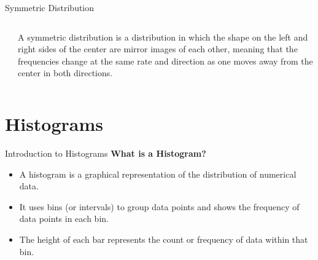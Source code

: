 \documentclass[handout]{beamer} %
\begin{document}
\begin{frame}{Symmetric Distribution}


\begin{columns}[T,onlytextwidth]
    \begin{column}{0.75\textwidth}
    \end{column}

    \hspace{-2em}
    \begin{column}{0.3\textwidth}
    \footnotesize
     A symmetric distribution is a distribution in which the shape on the left and right sides of the center are mirror images of each other, meaning that the frequencies change at the same rate and direction as one moves away from the center in both directions.
    \end{column}
\end{columns}

\end{frame}



\section{Histograms}

\begin{frame}{Introduction to Histograms}
    \textbf{What is a Histogram?}
    \begin{itemize}
        \item A histogram is a graphical representation of the distribution of numerical data.
        \item It uses bins (or intervals) to group data points and shows the frequency of data points in each bin.
        \item The height of each bar represents the count or frequency of data within that bin.
    \end{itemize}
\end{frame}
\end{document}
